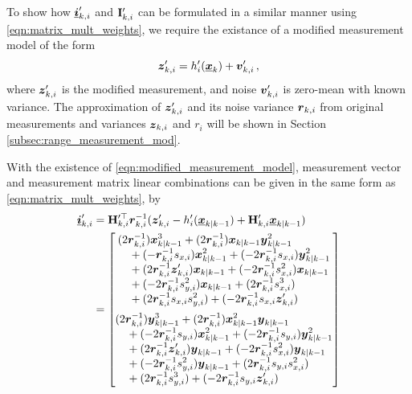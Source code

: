 \documentclass[10pt,letterpaper,oneside,twocolumn,journal]{IEEEtran}
\theoremstyle{definition}
\theoremstyle{definition}
\theoremstyle{remark}
\begin{document}
To show how ${\boldsymbol{\underline{i}}}'_{k,i}$ and ${{\mathbf{I}}}'_{k,i}$ can be formulated in a similar manner using \eqref{eqn:matrix_mult_weights}, we require the existance of a modified measurement model of the form
\begin{equation}
    \rv{z}'_{k,i} = h'_i(\rvec{x}_k)+\rv{v}'_{k,i}\,, \label{eqn:modified_measurement_model}
\end{equation}
where ${\boldsymbol{z}}'_{k,i}$ is the modified measurement, and noise ${\boldsymbol{v}}'_{k,i}$ is zero-mean with known variance. The approximation of ${\boldsymbol{z}}'_{k,i}$ and its noise variance ${\boldsymbol{r}}_{k,i}$ from original measurements and variances ${\boldsymbol{z}}_{k,i}$ and $r_i$ will be shown in Section \ref{subsec:range_measurement_mod}. 

With the existence of \eqref{eqn:modified_measurement_model}, measurement vector and measurement matrix linear combinations can be given in the same form as \eqref{eqn:matrix_mult_weights}, by
\begin{equation}
    \begin{split}
        \rvec{i}'_{k,i} &= \mat{H}_{k,i}^{\prime\top} \rv{r}_{k,i}^{-1}(\rv{z}'_{k,i} - h'_i(\rvec{x}_{k|k-1}) + \mat{H}'_{k,i}\rvec{x}_{k|k-1}) \\
        &= 
        \begin{bmatrix}
            \begin{split}
                &(2\rv{r}_{k,i}^{-1})\rv{x}_{k|k-1}^3 + (2\rv{r}_{k,i}^{-1})\rv{x}_{k|k-1}\rv{y}_{k|k-1}^2 \\
                &\quad+ (-\rv{r}_{k,i}^{-1}s_{x,i})\rv{x}_{k|k-1}^2 + (-2\rv{r}_{k,i}^{-1}s_{x,i})\rv{y}_{k|k-1}^2 \\
                &\quad+ (2\rv{r}_{k,i}^{-1}\rv{z}'_{k,i})\rv{x}_{k|k-1} + (-2\rv{r}_{k,i}^{-1}s_{x,i}^2)\rv{x}_{k|k-1}\\
                &\quad+ (-2\rv{r}_{k,i}^{-1}s_{y,i}^2)\rv{x}_{k|k-1} + (2\rv{r}_{k,i}^{-1}s_{x,i}^3) \\
                &\quad+ (2\rv{r}_{k,i}^{-1}s_{x,i}s_{y,i}^2) + (-2\rv{r}_{k,i}^{-1}s_{x,i} \rv{z}'_{k,i})
            \end{split}
            \vspace{5pt}\\
            \begin{split}
                &(2\rv{r}_{k,i}^{-1})\rv{y}_{k|k-1}^3 + (2\rv{r}_{k,i}^{-1})\rv{x}_{k|k-1}^2\rv{y}_{k|k-1} \\
                &\quad+ (-2\rv{r}_{k,i}^{-1}s_{y,i})\rv{x}_{k|k-1}^2 + (-2\rv{r}_{k,i}^{-1}s_{y,i})\rv{y}_{k|k-1}^2 \\
                &\quad+ (2\rv{r}_{k,i}^{-1}\rv{z}'_{k,i})\rv{y}_{k|k-1} + (-2\rv{r}_{k,i}^{-1}s_{x,i}^2)\rv{y}_{k|k-1} \\
                &\quad+ (-2\rv{r}_{k,i}^{-1}s_{y,i}^2)\rv{y}_{k|k-1} + (2\rv{r}_{k,i}^{-1}s_{y,i}s_{x,i}^2) \\
                &\quad+ (2\rv{r}_{k,i}^{-1}s_{y,i}^3) + (-2\rv{r}_{k,i}^{-1}s_{y,i}\rv{z}'_{k,i})
            \end{split}
        \end{bmatrix}
    \end{split} \label{eqn:hrz_linear_comb}
\end{equation}
\end{document}
